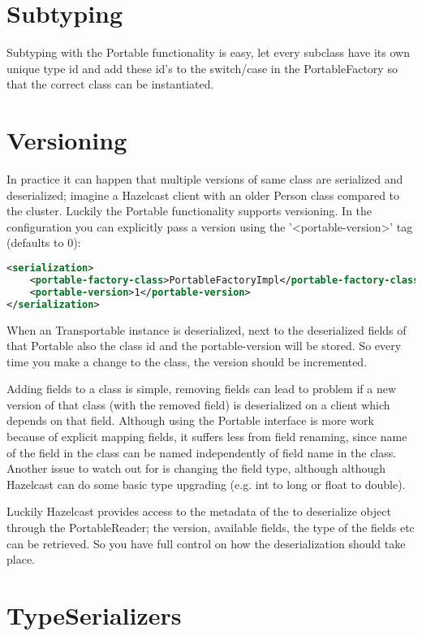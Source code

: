 \section{Subtyping}
Subtyping with the Portable functionality is easy, let every subclass have its own unique type id and add these id's to the switch/case in the PortableFactory so that the correct class can be instantiated. 

\section{Versioning}
In practice it can happen that multiple versions of same class are serialized and deserialized; imagine a Hazelcast client with an older Person class compared to the cluster. Luckily the Portable functionality supports versioning. In the configuration you can explicitly pass a version using the '<portable-version>' tag (defaults to 0):
\begin{lstlisting}[language=xml]
<serialization>
    <portable-factory-class>PortableFactoryImpl</portable-factory-class>
    <portable-version>1</portable-version>
</serialization>
\end{lstlisting}
When an Transportable instance is deserialized, next to the deserialized fields of that Portable also the class id and the portable-version will be stored. So every time you make a change to the class, the version should be incremented. 

Adding fields to a class is simple, removing fields can lead to problem if a new version of that class (with the removed field) is deserialized on a client which depends on that field. Although using the Portable interface is more work because of explicit mapping fields, it suffers less from field renaming, since name of the field in the class can be named independently of field name in the class. Another issue to watch out for is changing the field type, although although Hazelcast can do some basic type upgrading (e.g. int to long or float to double). 

Luckily Hazelcast provides access to the metadata of the to deserialize object through the PortableReader; the  version, available fields, the type of the fields etc can be retrieved. So you have full control on how the deserialization should take place. 

\section{TypeSerializers}

